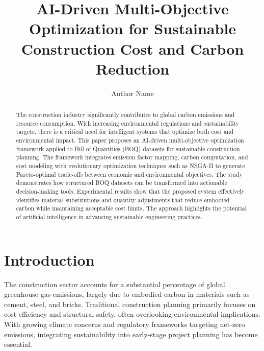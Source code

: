 \documentclass[sigconf]{acmart}
\begin{document}
\title{AI-Driven Multi-Objective Optimization for Sustainable Construction Cost and Carbon Reduction}

\author{Author Name}

\begin{abstract}
The construction industry significantly contributes to global carbon emissions and resource consumption. With increasing environmental regulations and sustainability targets, there is a critical need for intelligent systems that optimize both cost and environmental impact. This paper proposes an AI-driven multi-objective optimization framework applied to Bill of Quantities (BOQ) datasets for sustainable construction planning. The framework integrates emission factor mapping, carbon computation, and cost modeling with evolutionary optimization techniques such as NSGA-II to generate Pareto-optimal trade-offs between economic and environmental objectives. The study demonstrates how structured BOQ datasets can be transformed into actionable decision-making tools. Experimental results show that the proposed system effectively identifies material substitutions and quantity adjustments that reduce embodied carbon while maintaining acceptable cost limits. The approach highlights the potential of artificial intelligence in advancing sustainable engineering practices.
\end{abstract}


\maketitle

\section{Introduction}
The construction sector accounts for a substantial percentage of global greenhouse gas emissions, largely due to embodied carbon in materials such as cement, steel, and bricks. Traditional construction planning primarily focuses on cost efficiency and structural safety, often overlooking environmental implications. With growing climate concerns and regulatory frameworks targeting net-zero emissions, integrating sustainability into early-stage project planning has become essential.
\end{document}
